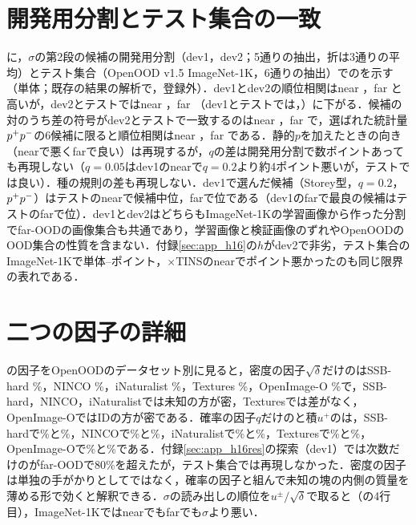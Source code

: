 \section{開発用分割とテスト集合の一致}
\label{sec:app_devtest}
に，$\sigma$の第2段の\NRDtNCand{}候補の開発用分割（dev1，dev2；5通りの抽出，折は3通りの平均）とテスト集合（OpenOOD v1.5 ImageNet-1K，6通りの抽出）での\FPR{}を示す（単体；既存の結果の解析で，登録外）．dev1とdev2の順位相関はnear \NRDtNearSpDevOneDevTwo{}，far \NRDtFarSpDevOneDevTwo{}と高いが，dev2とテストではnear \NRDtNearSpDevTwoTest{}，far \NRDtFarSpDevTwoTest{}（dev1とテストでは\NRDtNearSpDevOneTest{}，\NRDtFarSpDevOneTest{}）に下がる．候補の対のうち差の符号がdev2とテストで一致するのはnear \NRDtNearPairAgree{}，far \NRDtFarPairAgree{}で，選ばれた統計量$p^{+}p^{-}$の6候補に限ると順位相関はnear \NRDtNearSpPpOnly{}，far \NRDtFarSpPpOnly{}である．静的$p$を加えたときの向き（nearで悪くfarで良い）は再現するが，$q$の差は開発用分割で数ポイントあっても再現しない（$q{=}0.05$はdev1のnearで$q{=}0.2$より約4ポイント悪いが，テストでは良い）．種の規則の差も再現しない．dev1で選んだ候補（Storey型，$q{=}0.2$，$p^{+}p^{-}$）はテストのnearで\NRDtNCand{}候補中\NRDtNearRankOnTest{}位，farで\NRDtFarRankChosen{}位である（dev1のfarで最良の候補はテストのfarで\NRDtFarRankOnTest{}位）．dev1とdev2はどちらもImageNet-1Kの学習画像から作った分割でfar-OODの画像集合も共通であり，学習画像と検証画像のずれやOpenOODのOOD集合の性質を含まない．付録\ref{sec:app_h16}の$h$がdev2で非劣，テスト集合のImageNet-1Kで単体\NRHsTestMinDiff--\NRHsTestMaxDiff{}ポイント，$\times$TINSのnearで\NRHsTestTinsNearDiff{}ポイント悪かったのも同じ限界の表れである．

\begin{table}[htbp]
\centering
\caption{$\sigma$の第2段の候補の開発用分割とテスト集合での\FPR{}（単体）．順位はテスト集合での順位（\NRDtNCand{}候補中）．行はdev1 nearの昇順．}
\label{tab:devtest}
\vspace{1.5mm}

\end{table}

\section{二つの因子の詳細}
\label{sec:app_dec}
の因子をOpenOODのデータセット別に見ると，密度の因子$\sqrt{\delta}$だけの\AUC{}はSSB-hard \NRDecDegSsbHardAuroc\%，NINCO \NRDecDegNincoAuroc\%，iNaturalist \NRDecDegInatAuroc\%，Textures \NRDecDegTexturesAuroc\%，OpenImage-O \NRDecDegOpenimageoAuroc\%で，SSB-hard，NINCO，iNaturalistでは未知の方が密，Texturesでは差がなく，OpenImage-OではIDの方が密である．確率の因子$q$だけの\FPR{}と積$u^{+}$の\FPR{}は，SSB-hardで\NRDecQSsbHardFpr\%と\NRDecUSsbHardFpr\%，NINCOで\NRDecQNincoFpr\%と\NRDecUNincoFpr\%，iNaturalistで\NRDecQInatFpr\%と\NRDecUInatFpr\%，Texturesで\NRDecQTexturesFpr\%と\NRDecUTexturesFpr\%，OpenImage-Oで\NRDecQOpenimageoFpr\%と\NRDecUOpenimageoFpr\%である．付録\ref{sec:app_h16res}の探索（dev1）では次数だけの\AUC{}がfar-OODで80\%を超えたが，テスト集合では再現しなかった．密度の因子は単独の手がかりとしてではなく，確率の因子と組んで未知の塊の内側の質量を薄める形で効くと解釈できる．$\sigma$の読み出しの順位を$u^{\pm}/\sqrt{\delta}$で取ると（の4行目），ImageNet-1Kではnearでもfarでも$\sigma$より悪い．

